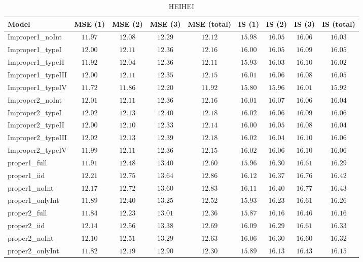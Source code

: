 \begin{table}

\caption{\label{tab:model-choice-sc12}HEIHEI}
\centering
\begin{tabular}{lcccccccc}
\hline
Model  & MSE (1) & MSE (2) & MSE (3) & MSE (total) & IS (1) & IS (2) & IS (3) & \multicolumn{1}{c}{IS (total)} \\ 
\hline
Improper1_noInt  & $11.97$ & $12.08$ & $12.29$ & $12.12$ & $15.98$ & $16.05$ & $16.06$ & $16.03$ \\
Improper1_typeI  & $12.00$ & $12.11$ & $12.36$ & $12.16$ & $16.00$ & $16.05$ & $16.09$ & $16.05$ \\
Improper1_typeII  & $11.92$ & $12.04$ & $12.36$ & $12.11$ & $15.93$ & $16.03$ & $16.10$ & $16.02$ \\
Improper1_typeIII  & $12.00$ & $12.11$ & $12.35$ & $12.15$ & $16.01$ & $16.06$ & $16.08$ & $16.05$ \\
Improper1_typeIV  & $11.72$ & $11.86$ & $12.20$ & $11.92$ & $15.80$ & $15.96$ & $16.01$ & $15.92$ \\
Improper2_noInt  & $12.01$ & $12.11$ & $12.36$ & $12.16$ & $16.01$ & $16.07$ & $16.06$ & $16.04$ \\
Improper2_typeI  & $12.02$ & $12.13$ & $12.40$ & $12.18$ & $16.02$ & $16.06$ & $16.09$ & $16.06$ \\
Improper2_typeII  & $12.00$ & $12.10$ & $12.33$ & $12.14$ & $16.00$ & $16.05$ & $16.08$ & $16.04$ \\
Improper2_typeIII  & $12.02$ & $12.13$ & $12.39$ & $12.18$ & $16.02$ & $16.04$ & $16.10$ & $16.06$ \\
Improper2_typeIV  & $11.99$ & $12.11$ & $12.36$ & $12.15$ & $16.02$ & $16.06$ & $16.10$ & $16.06$ \\
proper1_full  & $11.91$ & $12.48$ & $13.40$ & $12.60$ & $15.96$ & $16.30$ & $16.61$ & $16.29$ \\
proper1_iid  & $12.21$ & $12.75$ & $13.64$ & $12.86$ & $16.12$ & $16.37$ & $16.76$ & $16.42$ \\
proper1_noInt  & $12.17$ & $12.72$ & $13.60$ & $12.83$ & $16.11$ & $16.40$ & $16.77$ & $16.43$ \\
proper1_onlyInt  & $11.89$ & $12.40$ & $13.25$ & $12.52$ & $15.93$ & $16.23$ & $16.61$ & $16.26$ \\
proper2_full  & $11.84$ & $12.23$ & $13.01$ & $12.36$ & $15.87$ & $16.16$ & $16.46$ & $16.16$ \\
proper2_iid  & $12.14$ & $12.56$ & $13.38$ & $12.69$ & $16.09$ & $16.29$ & $16.61$ & $16.33$ \\
proper2_noInt  & $12.10$ & $12.51$ & $13.29$ & $12.63$ & $16.06$ & $16.30$ & $16.60$ & $16.32$ \\
proper2_onlyInt  & $11.82$ & $12.19$ & $12.90$ & $12.30$ & $15.89$ & $16.13$ & $16.43$ & $16.15$ \\
\hline 
\end{tabular}


\end{table}